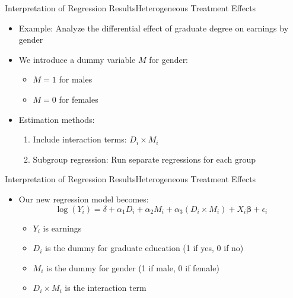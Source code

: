 \documentclass[dvipsnames,hyperref={pdfpagelabels=false}]{beamer}
\begin{document}
\begin{frame}{Interpretation of Regression Results}{Heterogeneous Treatment Effects}
	\begin{itemize}
	
		\item Example: Analyze the differential effect of graduate degree on earnings by gender
		\vspace{0.2cm}
		\item We introduce a dummy variable $M$ for gender:
		\begin{itemize}
			\item $M = 1$ for males
			\vspace{0.2cm}
			\item $M = 0$ for females
		\end{itemize}
		\item Estimation methods:
		\vspace{0.2cm}
		\begin{enumerate}
			\item Include interaction terms: $D_i \times M_i$
			\vspace{0.2cm}
			\item Subgroup regression: Run separate regressions for each group
		\end{enumerate}
		
		
	\end{itemize}
\end{frame}




\begin{frame}{Interpretation of Regression Results}{Heterogeneous Treatment Effects}
	\begin{itemize}
		\item Our new regression model becomes:
		\vspace{0.2cm}
		\begin{equation*}
			\log(Y_i) = \delta + \alpha_1 D_i + \alpha_2 M_i + \alpha_3 (D_i \times M_i) + X_i \boldsymbol{\beta} + \epsilon_i
		\end{equation*}
		\vspace{0.2cm}
		\begin{itemize}
			\item $Y_i$ is earnings
									\vspace{0.2cm}
			\item $D_i$ is the dummy for graduate education (1 if yes, 0 if no)
									\vspace{0.2cm}
			\item $M_i$ is the dummy for gender (1 if male, 0 if female)
									\vspace{0.2cm}
			\item $D_i \times M_i$ is the interaction term
		\end{itemize}
	\end{itemize}
\end{frame}
\end{document}
